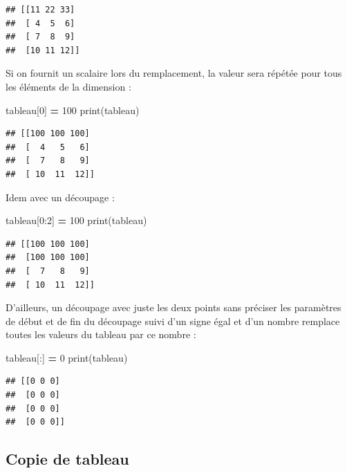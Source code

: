 \documentclass[12pt,]{book}
\newenvironment{Shaded}{\begin{snugshade}}{\end{snugshade}}
\newcommand{\DecValTok}[1]{\textcolor[rgb]{0.00,0.00,0.81}{#1}}
\newcommand{\OperatorTok}[1]{\textcolor[rgb]{0.81,0.36,0.00}{\textbf{#1}}}
\newcommand{\BuiltInTok}[1]{#1}
\newcommand{\NormalTok}[1]{#1}
\numberwithin{equation}{section}
\numberwithin{countremarque}{section}
\begin{document}
\begin{lstlisting}
## [[11 22 33]
##  [ 4  5  6]
##  [ 7  8  9]
##  [10 11 12]]
\end{lstlisting}

Si on fournit un scalaire lors du remplacement, la valeur sera répétée
pour tous les éléments de la dimension :

\begin{Shaded}
\begin{Highlighting}[]
\NormalTok{tableau[}\DecValTok{0}\NormalTok{] }\OperatorTok{=} \DecValTok{100}
\BuiltInTok{print}\NormalTok{(tableau)}
\end{Highlighting}
\end{Shaded}

\begin{lstlisting}
## [[100 100 100]
##  [  4   5   6]
##  [  7   8   9]
##  [ 10  11  12]]
\end{lstlisting}

Idem avec un découpage :

\begin{Shaded}
\begin{Highlighting}[]
\NormalTok{tableau[}\DecValTok{0}\NormalTok{:}\DecValTok{2}\NormalTok{] }\OperatorTok{=} \DecValTok{100}
\BuiltInTok{print}\NormalTok{(tableau)}
\end{Highlighting}
\end{Shaded}

\begin{lstlisting}
## [[100 100 100]
##  [100 100 100]
##  [  7   8   9]
##  [ 10  11  12]]
\end{lstlisting}

D'ailleurs, un découpage avec juste les deux points sans préciser les
paramètres de début et de fin du découpage suivi d'un signe égal et d'un
nombre remplace toutes les valeurs du tableau par ce nombre :

\begin{Shaded}
\begin{Highlighting}[]
\NormalTok{tableau[:] }\OperatorTok{=} \DecValTok{0}
\BuiltInTok{print}\NormalTok{(tableau)}
\end{Highlighting}
\end{Shaded}

\begin{lstlisting}
## [[0 0 0]
##  [0 0 0]
##  [0 0 0]
##  [0 0 0]]
\end{lstlisting}

\subsection{Copie de tableau}\label{copie-de-tableau}
\end{document}
